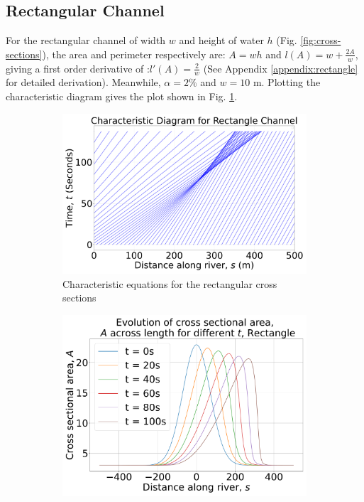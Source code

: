 \documentclass[12pt]{article}
\begin{document}
\subsection{Rectangular Channel}
For the rectangular channel of width $w$ and height of water $h$ (Fig. \ref{fig:cross-sections}), the area and perimeter respectively are: $A = wh$ and $l(A) = w + \frac{2A}{w}$, giving a first order derivative of :$l'(A) = \frac{2}{w}$ (See Appendix \ref{appendix:rectangle} for detailed derivation). Meanwhile, $\alpha = 2\%$ and $w = 10\text{ m}$. Plotting the characteristic diagram gives the plot shown in Fig. \ref{fig:rect_char}.
\begin{figure}[h]
    \centering
    \begin{subfigure}[b]{0.49\textwidth}
        \centering
            \includegraphics[width=\textwidth]{Figures/Rectangle_characteristic.pdf}
        \caption{Characteristic equations for the rectangular cross sections}
        \label{fig:rect_char}
    \end{subfigure}
    \hfill
    \begin{subfigure}[b]{0.49\textwidth}
        \centering
        \includegraphics[width=\textwidth]{Figures/Rectangle_godunov.pdf}

\end{subfigure}
\end{figure}
\end{document}
